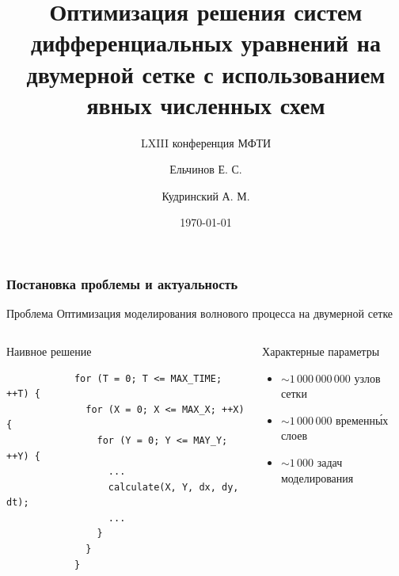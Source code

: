 \documentclass[presentation,18pt]{beamer}
\begin{document}
\title[Оптимизация LRnLA]{Оптимизация решения систем дифференциальных уравнений 
	на двумерной сетке с использованием явных численных схем}
\subtitle{LXIII конференция МФТИ}
\author[Ельчинов]{Ельчинов Е. С. \and
									Кудринский А. М.}
\date{\today}

\begin{frame}
	\label{titular}
	\titlepage
\end{frame}

\begin{frame}[fragile,t]
	\label{introductory}
	\frametitle{Постановка проблемы и актуальность}

	\begin{block}{Проблема}
		Оптимизация моделирования волнового процесса на двумерной сетке
	\end{block}

	\begin{columns}

		\begin{alertblock}{Наивное решение}
			\begin{verbatim}
			for (T = 0; T <= MAX_TIME; ++T) {
			  for (X = 0; X <= MAX_X; ++X) {
			    for (Y = 0; Y <= MAY_Y; ++Y) {
			      ...
			      calculate(X, Y, dx, dy, dt);
			      ...
			    }
			  }
			}
			\end{verbatim}
		\end{alertblock}

		\begin{block}{Характерные параметры}
			\begin{itemize}
				\vspace{1ex}
				\item{$\sim 1\,000\,000\,000$ узлов сетки}

				\vspace{1ex}
				\item{$\sim 1\,000\,000$ временн\'{ы}х слоев}

				\vspace{1ex}
				\item{$\sim 1\,000$ задач моделирования}
			\end{itemize}
		\end{block}

	\end{columns}
\end{frame}
\end{document}
